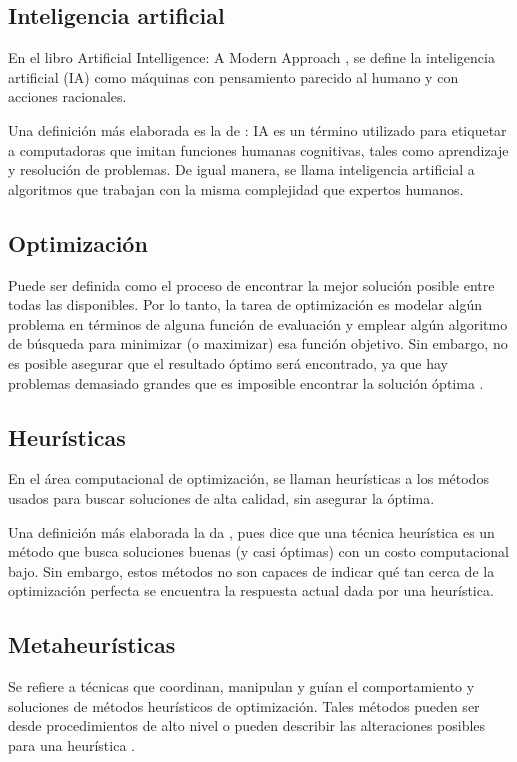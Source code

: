 \subsection{Inteligencia artificial}
  En el libro Artificial Intelligence: A Modern Approach
  \cite{AIModernAproach}, se define la inteligencia artificial (IA) como
  máquinas con pensamiento parecido al humano y con acciones racionales.
  
  Una definición más elaborada es la de \cite{AIDef}: IA es un término
  utilizado para etiquetar a computadoras que imitan funciones humanas
  cognitivas, tales como aprendizaje y resolución de problemas. De igual
  manera, se llama inteligencia artificial a algoritmos que trabajan con la
  misma complejidad que expertos humanos.

\subsection{Optimización}
  Puede ser definida como el proceso de encontrar la mejor solución posible
  entre todas las disponibles. Por lo tanto, la tarea de optimización es
  modelar algún problema en términos de alguna función de evaluación y emplear
  algún algoritmo de búsqueda para minimizar (o maximizar) esa función
  objetivo. Sin embargo, no es posible asegurar que el resultado óptimo será
  encontrado, ya que hay problemas demasiado grandes que es imposible
  encontrar la solución óptima \cite{SearchMethodologies}.

\subsection{Heurísticas}
  En el área computacional de optimización, se llaman heurísticas a los
  métodos usados para buscar soluciones de alta calidad, sin asegurar la
  óptima.

  Una definición más elaborada la da \cite{HeuristicDef}, pues dice
  que una técnica heurística es un método que busca soluciones buenas (y casi
  óptimas) con un costo computacional bajo. Sin embargo, estos métodos no son
  capaces de indicar qué tan cerca de la optimización perfecta se encuentra 
  la respuesta actual dada por una heurística.

\subsection{Metaheurísticas}
  Se refiere a técnicas que coordinan, manipulan y guían el comportamiento y
  soluciones de métodos heurísticos de optimización. Tales métodos pueden ser
  desde procedimientos de alto nivel o pueden describir las alteraciones
  posibles para una heurística \cite{MetaheuristicsDef}.

